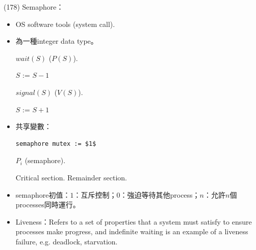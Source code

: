 \begin{theorem}{(178)} Semaphore：\begin{itemize}
        \item OS software tools (system call).
        \item 為一種integer data type。
        \begin{algorithm}[H]
            \caption{$wait(S)$ ($P(S)$).}
            \begin{algorithmic}[1]
                 
                    \EndWhile
                    \State $S$ := $S - 1$
                \EndFunction
            \end{algorithmic}
        \end{algorithm}
        \begin{algorithm}[H]
            \caption{$signal(S)$ ($V(S)$).}
            \begin{algorithmic}[1]
                 
                    \State $S$ := $S + 1$
                \EndFunction
            \end{algorithmic}
        \end{algorithm}
        \item 共享變數：\begin{lstlisting}[caption={Shared variables of semaphore.}, captionpos=b, mathescape=true]
            semaphore mutex := $1$
        \end{lstlisting}
        \begin{algorithm}[H]
            \caption{$P_i$ (semaphore).}
            \begin{algorithmic}[1]
                    \Repeat
                        \State {}
                        \State Critical section.
                        \State {}
                        \State Remainder section.
                \EndFunction
            \end{algorithmic}
        \end{algorithm}
        \item semaphore初值：$1$：互斥控制；$0$：強迫等待其他process；$n$：允許$n$個processes同時運行。
        \item Liveness：Refers to a set of properties that a system must satisfy to ensure processes make progress, and indefinite waiting is an example of a liveness failure, e.g. deadlock, starvation.

\end{itemize}
\end{theorem}
